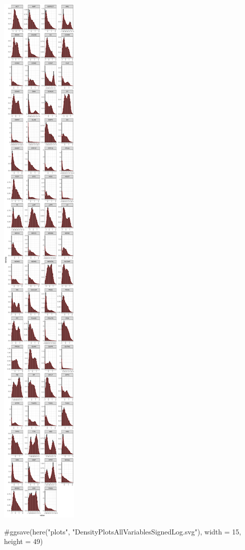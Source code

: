 \documentclass[
  letterpaper,
  DIV=11,
  numbers=noendperiod]{scrreprt}
\newenvironment{Shaded}{\begin{snugshade}}{\end{snugshade}}
\newcommand{\CommentTok}[1]{\textcolor[rgb]{0.37,0.37,0.37}{#1}}
\begin{document}
\includegraphics{F_Ch7_DataPrep_files/figure-pdf/signed.log.transformation-distributions-1.pdf}

\begin{Shaded}
\begin{Highlighting}[]
\CommentTok{\#ggsave(here("plots", "DensityPlotsAllVariablesSignedLog.svg"), width = 15, height = 49)}
\end{Highlighting}
\end{Shaded}
\end{document}

